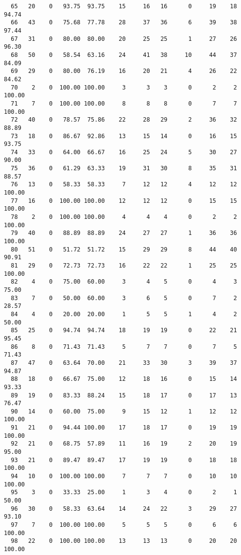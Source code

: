\begin{verbatim}
  65   20    0   93.75  93.75    15     16   16      0     19    18    94.74
  66   43    0   75.68  77.78    28     37   36      6     39    38    97.44
  67   31    0   80.00  80.00    20     25   25      1     27    26    96.30
  68   50    0   58.54  63.16    24     41   38     10     44    37    84.09
  69   29    0   80.00  76.19    16     20   21      4     26    22    84.62
  70    2    0  100.00 100.00     3      3    3      0      2     2   100.00
  71    7    0  100.00 100.00     8      8    8      0      7     7   100.00
  72   40    0   78.57  75.86    22     28   29      2     36    32    88.89
  73   18    0   86.67  92.86    13     15   14      0     16    15    93.75
  74   33    0   64.00  66.67    16     25   24      5     30    27    90.00
  75   36    0   61.29  63.33    19     31   30      8     35    31    88.57
  76   13    0   58.33  58.33     7     12   12      4     12    12   100.00
  77   16    0  100.00 100.00    12     12   12      0     15    15   100.00
  78    2    0  100.00 100.00     4      4    4      0      2     2   100.00
  79   40    0   88.89  88.89    24     27   27      1     36    36   100.00
  80   51    0   51.72  51.72    15     29   29      8     44    40    90.91
  81   29    0   72.73  72.73    16     22   22      1     25    25   100.00
  82    4    0   75.00  60.00     3      4    5      0      4     3    75.00
  83    7    0   50.00  60.00     3      6    5      0      7     2    28.57
  84    4    0   20.00  20.00     1      5    5      1      4     2    50.00
  85   25    0   94.74  94.74    18     19   19      0     22    21    95.45
  86    8    0   71.43  71.43     5      7    7      0      7     5    71.43
  87   47    0   63.64  70.00    21     33   30      3     39    37    94.87
  88   18    0   66.67  75.00    12     18   16      0     15    14    93.33
  89   19    0   83.33  88.24    15     18   17      0     17    13    76.47
  90   14    0   60.00  75.00     9     15   12      1     12    12   100.00
  91   21    0   94.44 100.00    17     18   17      0     19    19   100.00
  92   21    0   68.75  57.89    11     16   19      2     20    19    95.00
  93   21    0   89.47  89.47    17     19   19      0     18    18   100.00
  94   10    0  100.00 100.00     7      7    7      0     10    10   100.00
  95    3    0   33.33  25.00     1      3    4      0      2     1    50.00
  96   30    0   58.33  63.64    14     24   22      3     29    27    93.10
  97    7    0  100.00 100.00     5      5    5      0      6     6   100.00
  98   22    0  100.00 100.00    13     13   13      0     20    20   100.00

\end{verbatim}
